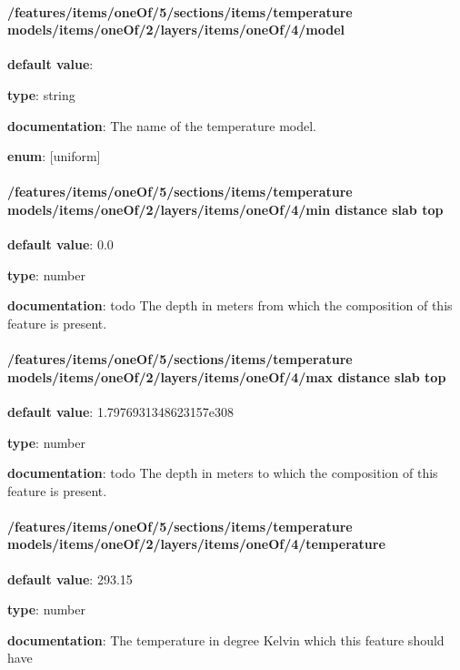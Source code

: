 \paragraph{/features/items/oneOf/5/sections/items/temperature models/items/oneOf/2/layers/items/oneOf/4/model} \begin{itemized}
\item {\bf default value}: 
\item {\bf type}: string
\item {\bf documentation}: The name of the temperature model.
\item {\bf enum}: [uniform]\end{itemized}\paragraph{/features/items/oneOf/5/sections/items/temperature models/items/oneOf/2/layers/items/oneOf/4/min distance slab top} \begin{itemized}
\item {\bf default value}: 0.0
\item {\bf type}: number
\item {\bf documentation}: todo The depth in meters from which the composition of this feature is present.
\end{itemized}\paragraph{/features/items/oneOf/5/sections/items/temperature models/items/oneOf/2/layers/items/oneOf/4/max distance slab top} \begin{itemized}
\item {\bf default value}: 1.7976931348623157e308
\item {\bf type}: number
\item {\bf documentation}: todo The depth in meters to which the composition of this feature is present.
\end{itemized}\paragraph{/features/items/oneOf/5/sections/items/temperature models/items/oneOf/2/layers/items/oneOf/4/temperature} \begin{itemized}
\item {\bf default value}: 293.15
\item {\bf type}: number
\item {\bf documentation}: The temperature in degree Kelvin which this feature should have

\end{itemized}
